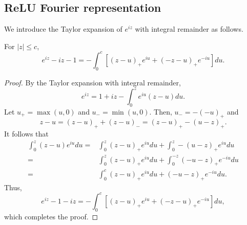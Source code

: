 \subsection{ReLU Fourier representation }%

We introduce the Taylor expansion of $e^{iz}$ with integral remainder as follows.
\begin{lemma}
For $|z|\leq c$, 
\begin{equation}  
e^{iz} -  iz -1
= 
- \int_{0}^c\left[(z - u)_+e^{iu} + (-z - u)_+e^{-iu} \right]du.
\end{equation}  
\end{lemma}
\begin{proof}  
By the Taylor expansion with integral remainder,
\begin{equation} 
e^{iz} = 1 + iz  - \int_0^z e^{iu}(z-u)du.
\end{equation}
Let $u_+=\max (u, 0)$ and $u_-=\min(u,0)$. Then, $u_-=-(-u)_+$ and 
$$
z-u=(z-u)_+ + (z-u)_-=(z-u)_+ - (u-z)_+.
$$
It follows that
\begin{equation}
\begin{split}
\int_{0}^z (z-u)e^{iu} du=&\int_{0}^z (z-u)_+e^{iu} du + \int_{0}^z -(u-z)_+e^{iu} du
\\
=&\int_{0}^z (z-u)_+e^{iu} du + \int_{0}^{-z}  (-u-z)_+e^{-iu} du
\\
=&\int_{0}^c (z-u)_+e^{iu} du + (-u-z)_+e^{-iu} du.
\end{split}
\end{equation}
Thus,
\begin{equation}  
e^{iz} - 1 - iz 
= 
-\int_{0}^c\left[(z - u)_+e^{iu} + (-z - u)_+e^{-iu} \right]du,
\end{equation}  
which completes the proof.
\end{proof}

